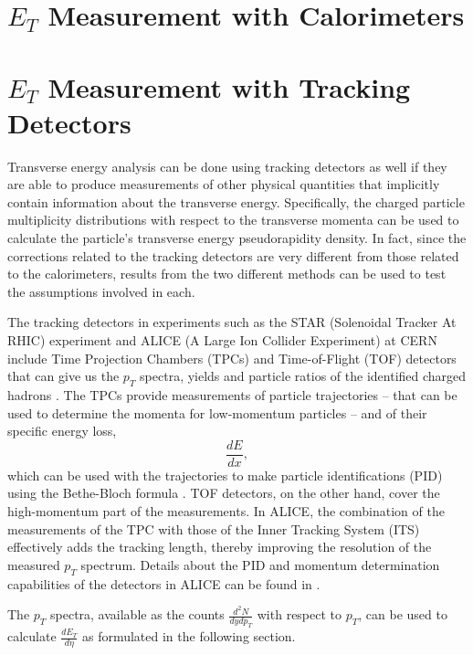 \section{$E_{T}$ Measurement with Calorimeters}

\section{$E_{T}$ Measurement with Tracking Detectors}
Transverse energy analysis can be done using tracking detectors as well if they are able to produce measurements of other physical quantities that implicitly contain information about the transverse energy. Specifically, the charged particle multiplicity distributions with respect to the transverse momenta can be used to calculate the particle's transverse energy pseudorapidity density. In fact, since the corrections related to the tracking detectors are very different from those related to the calorimeters, results from the two different methods can be used to test the assumptions involved in each.

The tracking detectors in experiments such as the STAR (Solenoidal Tracker At RHIC) experiment and ALICE (A Large Ion Collider Experiment) at CERN include Time Projection Chambers (TPCs) and Time-of-Flight (TOF) detectors that can give us the $p_{T}$ spectra, yields and particle ratios of the identified charged hadrons \cite{Preghenella:2011vy, PhysRevC.96.044904}. The TPCs provide measurements of particle trajectories -- that can be used to determine the momenta for low-momentum particles -- and of their specific energy loss, 
\begin{equation}\label{eqn:specificEnLoss}
	\frac{dE}{dx} ,
\end{equation}
which can be used with the trajectories to make particle identifications (PID) using the Bethe-Bloch formula \cite{bethe1953passage}. TOF detectors, on the other hand, cover the high-momentum part of the measurements. In ALICE, the combination of the measurements of the TPC with those of the Inner Tracking System (ITS) effectively adds the tracking length, thereby improving the resolution of the measured $p_{T}$ spectrum. Details about the PID and momentum determination capabilities of the detectors in ALICE can be found in \cite{1748-0221-3-08-S08002}.

The $p_{T}$ spectra, available as the counts $\frac{d^{2}N}{dydp_{T}}$ with respect to $p_{T}$, can be used to calculate $\frac{dE_{T}}{d\eta}$ as formulated in the following section.

